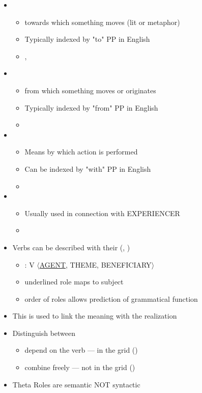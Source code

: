\documentclass[headrule,footrule]{foils}
\begin{document}
\begin{itemize}
\item  {}
  \begin{itemize}
  \item  towards which something moves (lit or metaphor)
 \item  Typically indexed by "to" PP in English 
 \item  {}, 
  \end{itemize}
\item  {}
 \begin{itemize}
 \item  from which something moves or originates
 \item  Typically indexed by "from" PP in English
 \item  {}  
 \end{itemize}
\newpage
\item  {}
  \begin{itemize}
  \item  Means by which action is performed
  \item  Can be indexed by "with" PP in English
  \item  {}
  \end{itemize}
\item  {}
  \begin{itemize}
  \item  Usually used in connection with EXPERIENCER
  \item  {}
\end{itemize}
\end{itemize}



\begin{itemize}
\item Verbs can be described with their 
  (, )

 \begin{itemize}
 \item  {}: V $\langle$\ul{AGENT}, THEME, BENEFICIARY$\rangle$
 \item  underlined role maps to subject
 \item  order of roles allows prediction of grammatical function
 \end{itemize}
\item  This is used to link the meaning with the realization
\item Distinguish between
  \begin{itemize}
  \item {} depend on the verb --- in the grid ()
  \item {} combine freely --- not in the grid ()
  \end{itemize}
\item Theta Roles are semantic NOT syntactic
\end{itemize}
\end{document}
